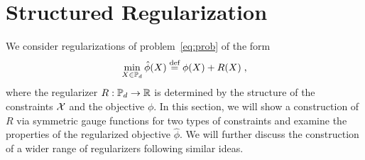 \documentclass[sn-nature]{sn-jnl}%
\theoremstyle{thmstyleone}%
\theoremstyle{thmstyletwo}%
\theoremstyle{thmstylethree}%
\begin{document}
\section{Structured Regularization}

We consider regularizations of problem~\ref{eq:prob} of the form
\begin{equation}
    \min_{X \in \mathbb{P}_d} \hat{\phi}(X) \stackrel{\text{def}}{=} \phi(X) + R(X) \; ,
\end{equation}
where the regularizer $R:\mathbb{P}_d \to \mathbb{R}$ is determined by the structure of the constraints $\mathcal{X}$ and the objective $\phi$. 
In this section, we will show a construction of $R$ via symmetric gauge functions for two types of constraints and examine the properties of the regularized objective $\hat{\phi}$. We will further discuss the construction of a wider range of regularizers following similar ideas.
\end{document}
